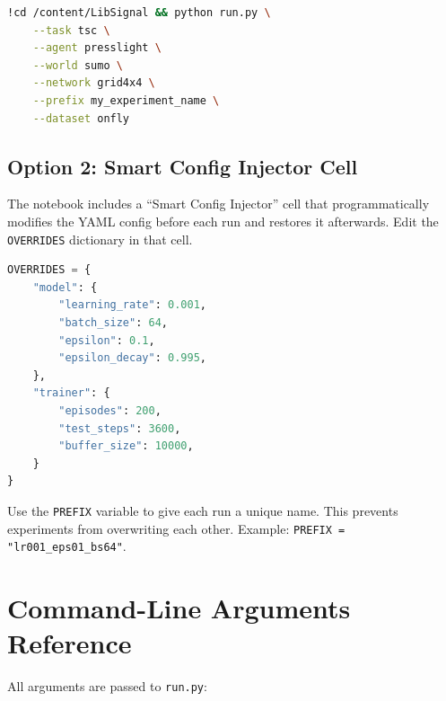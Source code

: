 \documentclass[11pt,a4paper]{article}
\begin{document}
\begin{lstlisting}[language=bash]
!cd /content/LibSignal && python run.py \
    --task tsc \
    --agent presslight \
    --world sumo \
    --network grid4x4 \
    --prefix my_experiment_name \
    --dataset onfly
\end{lstlisting}

\subsection{Option 2: Smart Config Injector Cell}

The notebook includes a ``Smart Config Injector'' cell that programmatically modifies the YAML config before each run and restores it afterwards.  Edit the \texttt{OVERRIDES} dictionary in that cell.

\begin{lstlisting}[language=Python]
OVERRIDES = {
    "model": {
        "learning_rate": 0.001,
        "batch_size": 64,
        "epsilon": 0.1,
        "epsilon_decay": 0.995,
    },
    "trainer": {
        "episodes": 200,
        "test_steps": 3600,
        "buffer_size": 10000,
    }
}
\end{lstlisting}

\begin{tipbox}
Use the \texttt{PREFIX} variable to give each run a unique name.
This prevents experiments from overwriting each other.
Example: \texttt{PREFIX = "lr001\_eps01\_bs64"}.
\end{tipbox}

\section{Command-Line Arguments Reference}

All arguments are passed to \texttt{run.py}:
\end{document}
